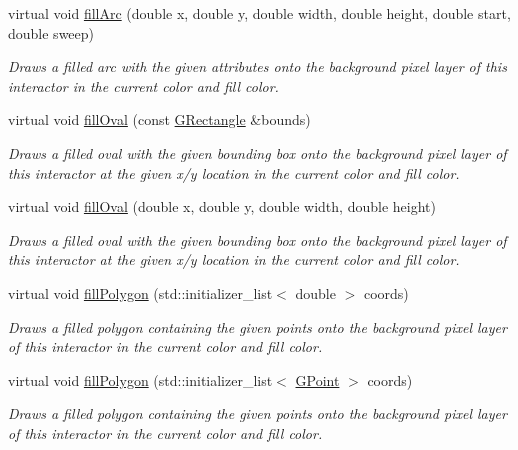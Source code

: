 \begin{DoxyCompactItemize}
virtual void \mbox{\hyperlink{classsgl_1_1GDrawingSurface_a228075ad18bd97b57f9956568c4773f3}{fill\+Arc}} (double x, double y, double width, double height, double start, double sweep)
\begin{DoxyCompactList}\small\item\em Draws a filled arc with the given attributes onto the background pixel layer of this interactor in the current color and fill color. \end{DoxyCompactList}\item 
virtual void \mbox{\hyperlink{classsgl_1_1GDrawingSurface_a1ea6e48d59fb588797dba4deab1397e0}{fill\+Oval}} (const \mbox{\hyperlink{structsgl_1_1GRectangle}{G\+Rectangle}} \&bounds)
\begin{DoxyCompactList}\small\item\em Draws a filled oval with the given bounding box onto the background pixel layer of this interactor at the given x/y location in the current color and fill color. \end{DoxyCompactList}\item 
virtual void \mbox{\hyperlink{classsgl_1_1GDrawingSurface_a28c700c82f31cd328a4629273420ee61}{fill\+Oval}} (double x, double y, double width, double height)
\begin{DoxyCompactList}\small\item\em Draws a filled oval with the given bounding box onto the background pixel layer of this interactor at the given x/y location in the current color and fill color. \end{DoxyCompactList}\item 
virtual void \mbox{\hyperlink{classsgl_1_1GDrawingSurface_a15f8c1c4409ef51c1a30a92a195b8f66}{fill\+Polygon}} (std\+::initializer\+\_\+list$<$ double $>$ coords)
\begin{DoxyCompactList}\small\item\em Draws a filled polygon containing the given points onto the background pixel layer of this interactor in the current color and fill color. \end{DoxyCompactList}\item 
virtual void \mbox{\hyperlink{classsgl_1_1GDrawingSurface_a31822d59786156ebf1cc3b2f7fb70330}{fill\+Polygon}} (std\+::initializer\+\_\+list$<$ \mbox{\hyperlink{structsgl_1_1GPoint}{G\+Point}} $>$ coords)
\begin{DoxyCompactList}\small\item\em Draws a filled polygon containing the given points onto the background pixel layer of this interactor in the current color and fill color. \end{DoxyCompactList}\item 

\end{DoxyCompactItemize}
